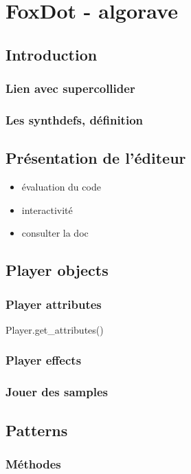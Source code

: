 \chapter{FoxDot - algorave}\label{appendix:foxdot}

\section{Introduction}
\subsection{Lien avec supercollider}
\subsection{Les synthdefs, définition}

\section{Présentation de l'éditeur}
\begin{itemize}
    \item évaluation du code
    \item interactivité
    \item consulter la doc
\end{itemize}

\section{Player objects}
\subsection{Player attributes}
Player.get\_attributes()
\subsection{Player effects}
\subsection{Jouer des samples}
\section{Patterns}
\subsection{Méthodes}
